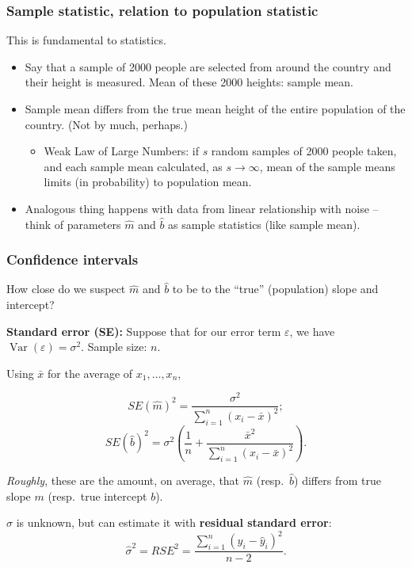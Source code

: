 \documentclass{beamer}
\theoremstyle{example}
\begin{document}
\begin{frame}
\frametitle{Sample statistic, relation to population statistic}
This is fundamental to statistics. 
\begin{itemize}
    \item Say that a sample of 2000 people are selected from around the country and their height is measured. Mean of these 2000 heights: sample mean.
    \pause
    \item Sample mean differs from the true mean height of the entire population of the country. (Not by much, perhaps.)
    \begin{itemize}
        \item Weak Law of Large Numbers: if $s$ random samples of 2000 people taken, and each sample mean calculated, as $s\to\infty$, mean of the sample means limits (in probability) to population mean.
    \end{itemize}
    \pause
    \item Analogous thing happens with data from linear relationship with noise {--} think of parameters $\hat{m}$ and $\hat{b}$ as sample statistics (like sample mean).
\end{itemize}

\end{frame}

\begin{frame}
\frametitle{Confidence intervals}
How close do we suspect $\hat{m}$ and $\hat{b}$ to be to the ``true'' (population) slope and intercept?

\pause
\textbf{Standard error (SE):}  Suppose that for our error term $\varepsilon$, we have $\operatorname{Var}(\varepsilon) = \sigma^2$. Sample size: $n$.

\pause
Using $\bar{x}$ for the average of $x_1,\ldots,x_n$,

\[SE(\hat{m})^2 = \frac{\sigma^2}{\sum_{i=1}^n(x_i - \bar{x})^2};\]
\[SE(\hat{b})^2 = \sigma^2\left(\frac1{n} + \frac{\bar{x}^2}{\sum_{i=1}^n(x_i - \bar{x})^2}\right).\]

\pause
\emph{Roughly}, these are the amount, on average, that $\hat{m}$ (resp.\ $\hat{b}$) differs from true slope $m$ (resp.\ true intercept $b$).

\pause
$\sigma$ is unknown, but can estimate it with \textbf{residual standard error}:
    \[\hat{\sigma}^2 = RSE^2 = \frac{\sum_{i=1}^n(y_i - \hat{y}_i)^2}{n-2}.\]

\end{frame}
\end{document}
